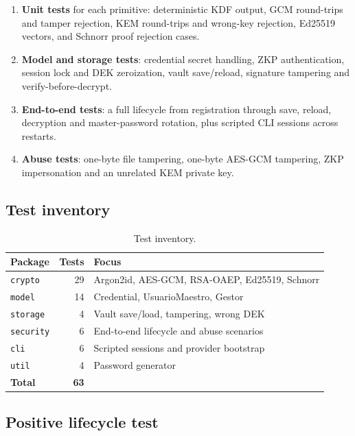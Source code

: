\documentclass[11pt,a4paper]{article}
\newcommand{\code}[1]{\texttt{#1}}
\begin{document}
\begin{enumerate}[leftmargin=*]
  \item \textbf{Unit tests} for each primitive: deterministic KDF output, GCM
        round-trips and tamper rejection, KEM round-trips and wrong-key
        rejection, Ed25519 vectors, and Schnorr proof rejection cases.
  \item \textbf{Model and storage tests}: credential secret handling, ZKP
        authentication, session lock and DEK zeroization, vault save/reload,
        signature tampering and verify-before-decrypt.
  \item \textbf{End-to-end tests}: a full lifecycle from registration through
        save, reload, decryption and master-password rotation, plus scripted CLI
        sessions across restarts.
  \item \textbf{Abuse tests}: one-byte file tampering, one-byte AES-GCM
        tampering, ZKP impersonation and an unrelated KEM private key.
\end{enumerate}

\subsection{Test inventory}

\begin{table}[htbp]
\centering
\small
\begin{tabular}{@{}lrl@{}}
\toprule
\textbf{Package} & \textbf{Tests} & \textbf{Focus} \\
\midrule
\code{crypto}  & 29 & Argon2id, AES-GCM, RSA-OAEP, Ed25519, Schnorr \\
\code{model}   & 14 & Credential, UsuarioMaestro, Gestor \\
\code{storage} & 4  & Vault save/load, tampering, wrong DEK \\
\code{security}& 6  & End-to-end lifecycle and abuse scenarios \\
\code{cli}     & 6  & Scripted sessions and provider bootstrap \\
\code{util}    & 4  & Password generator \\
\midrule
\textbf{Total} & \textbf{63} & \\
\bottomrule
\end{tabular}
\caption{Test inventory.}
\label{tab:tests}
\end{table}

\subsection{Positive lifecycle test}
\end{document}
